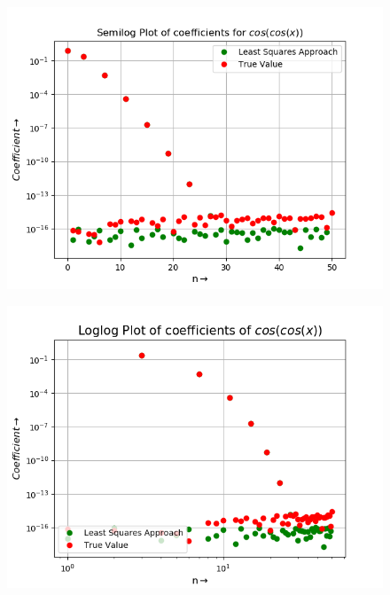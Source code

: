 \documentclass[11pt, a4paper]{article}
\begin{document}
\begin{figure}
\centering
\begin{minipage}{.5\textwidth}
  \centering
  \includegraphics[width=\linewidth]{fig9.png}
  \label{fig:test1}
\end{minipage}%
\begin{minipage}{.5\textwidth}
  \centering
  \includegraphics[width=\linewidth]{fig10.png}
  \label{fig:test2}
\end{minipage}
\end{figure}
\end{document}
